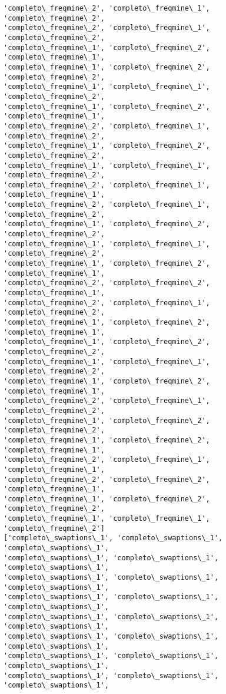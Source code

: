 \documentclass[11pt]{article}
\begin{document}
\begin{Verbatim}[commandchars=\\\{\}]
'completo\_freqmine\_2', 'completo\_freqmine\_1', 'completo\_freqmine\_2',
'completo\_freqmine\_2', 'completo\_freqmine\_1', 'completo\_freqmine\_2',
'completo\_freqmine\_1', 'completo\_freqmine\_2', 'completo\_freqmine\_1',
'completo\_freqmine\_1', 'completo\_freqmine\_2', 'completo\_freqmine\_2',
'completo\_freqmine\_1', 'completo\_freqmine\_1', 'completo\_freqmine\_2',
'completo\_freqmine\_1', 'completo\_freqmine\_2', 'completo\_freqmine\_1',
'completo\_freqmine\_2', 'completo\_freqmine\_1', 'completo\_freqmine\_2',
'completo\_freqmine\_1', 'completo\_freqmine\_2', 'completo\_freqmine\_2',
'completo\_freqmine\_1', 'completo\_freqmine\_1', 'completo\_freqmine\_2',
'completo\_freqmine\_2', 'completo\_freqmine\_1', 'completo\_freqmine\_1',
'completo\_freqmine\_2', 'completo\_freqmine\_1', 'completo\_freqmine\_2',
'completo\_freqmine\_1', 'completo\_freqmine\_2', 'completo\_freqmine\_2',
'completo\_freqmine\_1', 'completo\_freqmine\_1', 'completo\_freqmine\_2',
'completo\_freqmine\_1', 'completo\_freqmine\_2', 'completo\_freqmine\_1',
'completo\_freqmine\_2', 'completo\_freqmine\_2', 'completo\_freqmine\_1',
'completo\_freqmine\_2', 'completo\_freqmine\_1', 'completo\_freqmine\_2',
'completo\_freqmine\_1', 'completo\_freqmine\_2', 'completo\_freqmine\_1',
'completo\_freqmine\_1', 'completo\_freqmine\_2', 'completo\_freqmine\_2',
'completo\_freqmine\_1', 'completo\_freqmine\_1', 'completo\_freqmine\_2',
'completo\_freqmine\_1', 'completo\_freqmine\_2', 'completo\_freqmine\_1',
'completo\_freqmine\_2', 'completo\_freqmine\_1', 'completo\_freqmine\_2',
'completo\_freqmine\_1', 'completo\_freqmine\_2', 'completo\_freqmine\_2',
'completo\_freqmine\_1', 'completo\_freqmine\_2', 'completo\_freqmine\_1',
'completo\_freqmine\_2', 'completo\_freqmine\_1', 'completo\_freqmine\_1',
'completo\_freqmine\_2', 'completo\_freqmine\_2', 'completo\_freqmine\_1',
'completo\_freqmine\_1', 'completo\_freqmine\_2', 'completo\_freqmine\_2',
'completo\_freqmine\_1', 'completo\_freqmine\_1', 'completo\_freqmine\_2']
['completo\_swaptions\_1', 'completo\_swaptions\_1', 'completo\_swaptions\_1',
'completo\_swaptions\_1', 'completo\_swaptions\_1', 'completo\_swaptions\_1',
'completo\_swaptions\_1', 'completo\_swaptions\_1', 'completo\_swaptions\_1',
'completo\_swaptions\_1', 'completo\_swaptions\_1', 'completo\_swaptions\_1',
'completo\_swaptions\_1', 'completo\_swaptions\_1', 'completo\_swaptions\_1',
'completo\_swaptions\_1', 'completo\_swaptions\_1', 'completo\_swaptions\_1',
'completo\_swaptions\_1', 'completo\_swaptions\_1', 'completo\_swaptions\_1',
'completo\_swaptions\_1', 'completo\_swaptions\_1', 'completo\_swaptions\_1',

\end{Verbatim}
\end{document}
